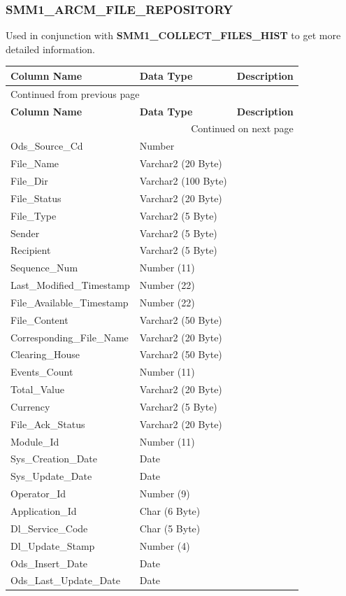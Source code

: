 \documentclass[12pt,twoside]{article}
\begin{document}
\normalsize
\subsubsection{SMM1\_ARCM\_FILE\_REPOSITORY}
\label{sec:orgheadline81}
Used in conjunction with \textbf{SMM1\_COLLECT\_FILES\_HIST} to get more detailed information.
\footnotesize

\begin{longtable}{l|l|l}
\hline
\textbf{Column Name} & \textbf{Data Type} & \textbf{Description}\\
\hline
\endfirsthead
\multicolumn{3}{l}{Continued from previous page} \\
\hline

\textbf{Column Name} & \textbf{Data Type} & \textbf{Description} \\

\hline
\endhead
\hline\multicolumn{3}{r}{Continued on next page} \\
\endfoot
\endlastfoot
\hline
Ods\_Source\_Cd & Number & \\
File\_Name & Varchar2 (20 Byte) & \\
File\_Dir & Varchar2 (100 Byte) & \\
File\_Status & Varchar2 (20 Byte) & \\
File\_Type & Varchar2 (5 Byte) & \\
Sender & Varchar2 (5 Byte) & \\
Recipient & Varchar2 (5 Byte) & \\
Sequence\_Num & Number (11) & \\
Last\_Modified\_Timestamp & Number (22) & \\
File\_Available\_Timestamp & Number (22) & \\
File\_Content & Varchar2 (50 Byte) & \\
Corresponding\_File\_Name & Varchar2 (20 Byte) & \\
Clearing\_House & Varchar2 (50 Byte) & \\
Events\_Count & Number (11) & \\
Total\_Value & Varchar2 (20 Byte) & \\
Currency & Varchar2 (5 Byte) & \\
File\_Ack\_Status & Varchar2 (20 Byte) & \\
Module\_Id & Number (11) & \\
Sys\_Creation\_Date & Date & \\
Sys\_Update\_Date & Date & \\
Operator\_Id & Number (9) & \\
Application\_Id & Char (6 Byte) & \\
Dl\_Service\_Code & Char (5 Byte) & \\
Dl\_Update\_Stamp & Number (4) & \\
Ods\_Insert\_Date & Date & \\
Ods\_Last\_Update\_Date & Date & \\
\hline
\end{longtable}
\end{document}
